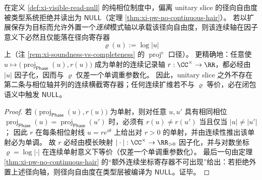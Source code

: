 \begin{corollary}\label{cor:xi-unique-continuous-transverse-register}
在定义 \ref{def:xi-visible-read-null} 的纯相位制度中，偏离 unitary slice 的径向自由度被类型系统拒绝并读出为 \(\mathsf{NULL}\)（定理 \ref{thm:xi-pw-no-continuous-hair}）。
若以扩展保存为目标而允许外置一个\emph{连续}模式轴以承载该径向自由度，则该连续轴在因子意义下必然且仅能落在径向寄存器
\[
\varrho(u):=\log|u|
\]
上（注 \ref{rem:xi-soundness-vs-completeness} 的 \(\operatorname{proj}^{\mathrm e}\) 口径）。
更精确地：任意使
\(
u\mapsto \bigl(\operatorname{proj}_{\mathsf{Phase}}(u),r(u)\bigr)
\)
成为单射的连续记录轴 \(r:\CC^\times\to\RR\)，都必经由 \(|u|\) 因子化，因而与 \(\varrho\) 仅差一个单调重参数化。
因此，unitary slice 之外不存在第二条与相位轴并列的连续横截寄存器；任何连续扩维若不与 \(\varrho\) 等价，必在闭包语义中触发 \(\mathsf{NULL}\)。
\end{corollary}

\begin{proof}
若 \(\bigl(\operatorname{proj}_{\mathsf{Phase}}(u),r(u)\bigr)\) 为单射，则对任意 \(u,u'\) 具有相同相位 \(\operatorname{proj}_{\mathsf{Phase}}(u)=\operatorname{proj}_{\mathsf{Phase}}(u')\) 时，必须有 \(r(u)\neq r(u')\) 当且仅当 \(|u|\neq |u'|\)；
因此 \(r\) 在每条相位射线 \(u=re^{i\theta}\) 上给出对 \(r>0\) 的单射，并由连续性推出该单射必为单调。
故 \(r\) 必经由模长映射 \(|\cdot|:\CC^\times\to\RR_{>0}\) 因子化，并与对数坐标 \(\varrho=\log|\cdot|\) 在连续单射意义下等价（仅差一个单调重参数化）。
最后一句由定理 \ref{thm:xi-pw-no-continuous-hair} 的“额外连续坐标寄存器不可出现”给出：若拒绝外置上述径向轴，则径向自由度在类型层被编译为 \(\mathsf{NULL}\)。证毕。
\end{proof}

